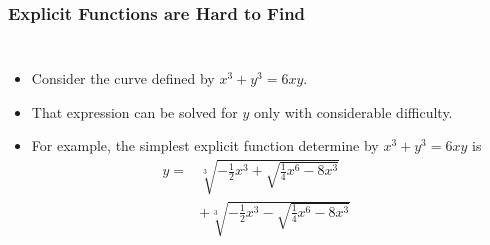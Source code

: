 \documentclass[serif,ignorenonframetext]{beamer}
\begin{document}
\begin{frame}
  \frametitle{Explicit Functions are Hard to Find}
  \begin{columns}
  \begin{itemize}[<+->]
  \item Consider the curve defined by $x^3+y^3=6xy$.
  \item That expression can be solved for $y$ only with
    considerable difficulty.
  \item For example, the simplest explicit function
    determine by $x^3+y^3=6xy$ is
    \begin{align*}
      y =& \sqrt[3]{-\frac{1}{2}x^3+\sqrt{\frac{1}{4}x^6-8x^3}} \\
         &+ \sqrt[3]{-\frac{1}{2}x^3-\sqrt{\frac{1}{4}x^6-8x^3}}
    \end{align*}
  \end{itemize}

\end{columns}
\end{frame}
\end{document}
